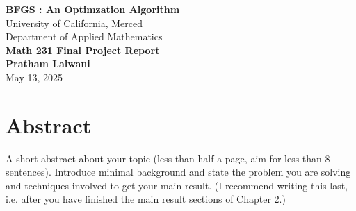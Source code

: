 \documentclass[12pt]{report}
\date{}
\begin{document}
\begin{titlepage}
	\centering
	\vspace*{\fill}
	{\bf \LARGE BFGS : An Optimzation Algorithm\\}
	\vspace{1cm}
	{\Large University of California, Merced\\}
	\vspace{0.5cm}
	{\large Department of Applied Mathematics\\}
	\vspace{1.5cm}
	{\bf \Large Math 231 Final Project Report\\}
	\vspace{1.5cm}
	{\bf \Large Pratham Lalwani\\}
	\vspace{2cm}
	{\large May 13, 2025\\}
	\vspace*{\fill}
\end{titlepage}

\clearpage
\setcounter{page}{1}
\renewcommand{\thepage}{\roman{page}}

%

\chapter*{Abstract}
A short abstract about your topic (less than half a page, aim for less than 8 sentences). Introduce minimal background and state the problem you are solving and techniques involved to get your main result. (I recommend writing this last, i.e. after you have finished the main result sections of Chapter 2.)

\tableofcontents
{}
\newpage
\listoffigures
{}
\newpage
\listoftables
{}
\newpage
\renewcommand{\thepage}{\arabic{page}}
\setcounter{page}{1}
\end{document}
